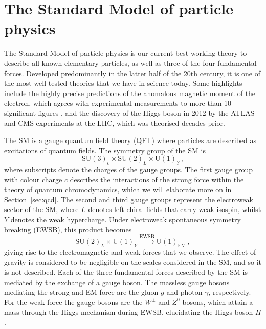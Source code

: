 \documentclass[main.tex]{subfiles}
\begin{document}
\section{The Standard Model of particle physics}
    The Standard Model of particle physics is our current
    best working theory to describe all known elementary particles,
    as well as three of the four fundamental forces. Developed
    predominantly in the latter half of the 20th century, it is
    one of the most well tested theories that we have in science today.
    Some highlights include the highly precise predictions of the
    anomalous magnetic moment of the electron, which agrees with experimental
    measurements to more than 10 significant figures \cite{Aoyama:2017uqe},
    and the discovery of the Higgs boson in 2012 by the ATLAS \cite{ATLAS:2012yve}
    and CMS experiments \cite{CMS:2012qbp} at the LHC,
    which was theorised decades prior.

    The SM is a gauge quantum field theory (QFT) where particles
    are described as excitations of quantum fields. The symmetry group
    of the SM is
    \begin{equation}\label{eqn:SM_gauge}
        \mathrm{SU}(3)_{c} \times \mathrm{SU}(2)_{L} \times \mathrm{U}(1)_{Y}\, ,
    \end{equation}
    where subscripts denote the charges of the gauge groups. The first gauge
    group with colour charge $c$ describes the interactions of the
    strong force within the theory of quantum chromodynamics, which we
    will elaborate more on in Section~\ref{sec:qcd}. The second
    and third gauge groups represent the electroweak sector of the SM, where
    $L$ denotes left-chiral fields that carry weak isospin, whilst $Y$ denotes
    the weak hypercharge. Under electroweak
    spontaneous symmetry breaking (EWSB), this product becomes
    \begin{equation}\label{eqn:SM_SSB}
        \mathrm{SU}(2)_{L} \times \mathrm{U}(1)_{Y} \xrightarrow{\mathrm{EWSB}} \mathrm{U}(1)_{\mathrm{EM}} \, ,
    \end{equation}
    giving rise to the electromagnetic and weak forces that we observe.
    The effect of gravity is considered to be negligible on the scales
    considered in the SM, and so it is not described.
    Each of the three fundamental forces described by the SM is mediated
    by the exchange of a gauge boson. The massless gauge bosons mediating the strong
    and EM force are the gluon $g$ and photon $\gamma$,
    respectively. For the weak force the gauge bosons are the $W^{\pm}$
    and $Z^{0}$ bosons, which attain a mass through the Higgs mechanism \cite{Englert:1964et,Higgs:1964pj,Guralnik:1964eu}
    during EWSB, elucidating the Higgs boson $H$.
\end{document}

